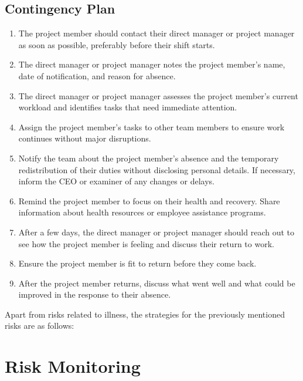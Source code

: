 \documentclass{article}
\begin{document}
\subsection{Contingency Plan}
\label{sec:contingency}
\begin{enumerate}[label=\textbf{\arabic*.}]
    \item The project member should contact their direct manager or project manager as soon as possible, preferably before their shift starts.  

    \item The direct manager or project manager notes the project member's name, date of notification, and reason for absence.  

    \item The direct manager or project manager assesses the project member’s current workload and identifies tasks that need immediate attention.  

    \item Assign the project member's tasks to other team members to ensure work continues without major disruptions.  

    \item Notify the team about the project member’s absence and the temporary redistribution of their duties without disclosing personal details. If necessary, inform the CEO or examiner of any changes or delays.  

    \item Remind the project member to focus on their health and recovery. Share information about health resources or employee assistance programs.  

    \item After a few days, the direct manager or project manager should reach out to see how the project member is feeling and discuss their return to work.  

    \item Ensure the project member is fit to return before they come back. 

    \item After the project member returns, discuss what went well and what could be improved in the response to their absence.  
\end{enumerate}

Apart from risks related to illness, the strategies for the previously mentioned risks are as follows:

\newpage
\section{Risk Monitoring}
\end{document}
